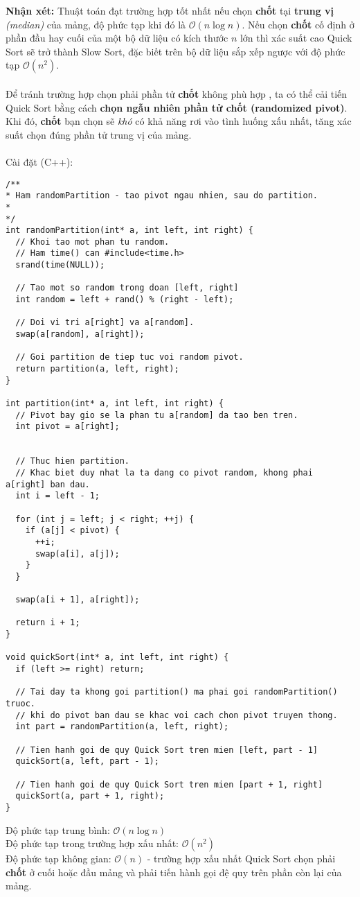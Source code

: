 \documentclass[]{article}
\begin{document}
\textbf{Nhận xét:} Thuật toán đạt trường hợp tốt nhất nếu chọn \textbf{chốt} tại \textbf{trung vị} \textit{(median)} của mảng, độ phức tạp khi đó là $\mathcal{O}(n \log n)$. Nếu chọn \textbf{chốt} cố định ở phần đầu hay cuối của một bộ dữ liệu có kích thước $n$ lớn thì xác suất cao Quick Sort sẽ trở thành Slow Sort, đặc biết trên bộ dữ liệu sắp xếp ngược với độ phức tạp $\mathcal{O}(n^2)$.
\\\\
Để tránh trường hợp chọn phải phần tử \textbf{chốt} không phù hợp , ta có thể cải tiến Quick Sort bằng cách \textbf{chọn ngẫu nhiên phần tử chốt (randomized pivot)}. Khi đó, \textbf{chốt} bạn chọn sẽ \textit{khó} có khả năng rơi vào tình huống xấu nhất, tăng xác suất chọn đúng phần tử trung vị của mảng. \cite{LMHoang}
\label{subsec:randompivot}
\\\\
Cài đặt (C++):
\begin{lstlisting}
/**
* Ham randomPartition - tao pivot ngau nhien, sau do partition.
*
*/
int randomPartition(int* a, int left, int right) {
  // Khoi tao mot phan tu random.
  // Ham time() can #include<time.h>
  srand(time(NULL));

  // Tao mot so random trong doan [left, right]
  int random = left + rand() % (right - left);

  // Doi vi tri a[right] va a[random].
  swap(a[random], a[right]);

  // Goi partition de tiep tuc voi random pivot.
  return partition(a, left, right);
}

int partition(int* a, int left, int right) {
  // Pivot bay gio se la phan tu a[random] da tao ben tren.
  int pivot = a[right];


  // Thuc hien partition.
  // Khac biet duy nhat la ta dang co pivot random, khong phai a[right] ban dau.
  int i = left - 1;

  for (int j = left; j < right; ++j) {
    if (a[j] < pivot) {
      ++i;
      swap(a[i], a[j]);
    }
  }

  swap(a[i + 1], a[right]);

  return i + 1;
}

void quickSort(int* a, int left, int right) {
  if (left >= right) return;

  // Tai day ta khong goi partition() ma phai goi randomPartition() truoc.
  // khi do pivot ban dau se khac voi cach chon pivot truyen thong.
  int part = randomPartition(a, left, right);

  // Tien hanh goi de quy Quick Sort tren mien [left, part - 1]
  quickSort(a, left, part - 1);

  // Tien hanh goi de quy Quick Sort tren mien [part + 1, right]
  quickSort(a, part + 1, right);
}
\end{lstlisting}
Độ phức tạp trung bình: $\mathcal{O}(n \log n)$
\\
Độ phức tạp trong trường hợp xấu nhất: $\mathcal{O}(n^2)$
\\
Độ phức tạp không gian: $\mathcal{O}(n)$ - trường hợp xấu nhất Quick Sort chọn phải \textbf{chốt} ở cuối hoặc đầu mảng và phải tiến hành gọi đệ quy trên phần còn lại của mảng.
\end{document}
